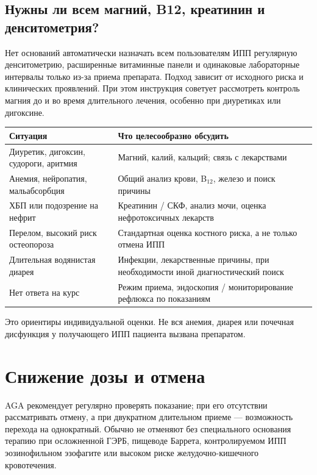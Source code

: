 \documentclass[11pt,a4paper,notitlepage]{report}
\newcommand{\src}[1]{\unskip\space\cite{#1}}
\begin{document}
\subsection{Нужны ли всем магний, B12, креатинин и денситометрия?}
Нет оснований автоматически назначать всем пользователям ИПП регулярную денситометрию, расширенные витаминные панели и одинаковые лабораторные интервалы только из-за приема препарата. Подход зависит от исходного риска и клинических проявлений. При этом инструкция советует рассмотреть контроль магния до и во время длительного лечения, особенно при диуретиках или дигоксине.\src{acggerd,uslabel}

\begin{longtable}{P{0.34\textwidth}P{0.59\textwidth}}
\toprule
Ситуация & Что целесообразно обсудить \\
\midrule
\endhead
Диуретик, дигоксин, судороги, аритмия & Магний, калий, кальций; связь с лекарствами \\
Анемия, нейропатия, мальабсорбция & Общий анализ крови, B$_{12}$, железо и поиск причины \\
ХБП или подозрение на нефрит & Креатинин / СКФ, анализ мочи, оценка нефротоксичных лекарств \\
Перелом, высокий риск остеопороза & Стандартная оценка костного риска, а не только отмена ИПП \\
Длительная водянистая диарея & Инфекции, лекарственные причины, при необходимости иной диагностический поиск \\
Нет ответа на курс & Режим приема, эндоскопия / мониторирование рефлюкса по показаниям \\
\bottomrule
\end{longtable}
Это ориентиры индивидуальной оценки. Не вся анемия, диарея или почечная дисфункция у получающего ИПП пациента вызвана препаратом.\src{uslabel,agagerd,kidney}

\section{Снижение дозы и отмена}
\label{sec:withdrawal}

AGA рекомендует регулярно проверять показание; при его отсутствии рассматривать отмену, а при двукратном длительном приеме --- возможность перехода на однократный. Обычно не отменяют без специального основания терапию при осложненной ГЭРБ, пищеводе Баррета, контролируемом ИПП эозинофильном эзофагите или высоком риске желудочно-кишечного кровотечения.\src{agadepres}
\end{document}

